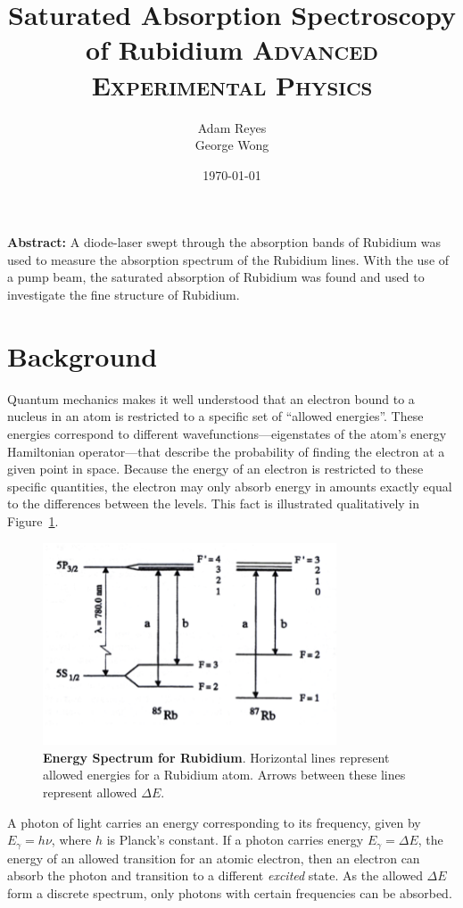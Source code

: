 \documentclass[paper=a4, fontsize=11pt]{scrartcl} %
\title{	
Saturated Absorption Spectroscopy of Rubidium
\horrule{0.5pt}
\normalfont \normalsize 
\textsc{Advanced Experimental Physics }
}
\author{Adam Reyes \\ George Wong} %
\date{\normalsize\today} %
\numberwithin{equation}{section}
\numberwithin{figure}{section}
\numberwithin{table}{section}
\begin{document}
\maketitle
\noindent\textbf{Abstract:}
A diode-laser swept through the absorption bands of Rubidium was used
to measure the absorption spectrum of the Rubidium lines. With the use
of a pump beam, the saturated absorption of Rubidium was found and
used to investigate the fine structure of Rubidium. 


\section{Background}


\indent Quantum mechanics makes it well understood that an electron bound to a nucleus in
an atom is restricted to a specific set of ``allowed energies''. These energies correspond to different wavefunctions---eigenstates of the atom's energy Hamiltonian operator---that
describe the probability of finding the electron at a given point in
space. Because the energy of an electron is restricted to these specific quantities, the electron
may only absorb energy in amounts exactly equal to the differences between 
the levels. This fact is illustrated qualitatively in Figure~\ref{fig:energies}. 

 \begin{figure}[h] \begin{center}
  \includegraphics[height=60mm]{energy.png}
  \caption{\textbf{Energy Spectrum for Rubidium}\cite{caltech}. Horizontal lines
    represent allowed energies for a Rubidium atom. Arrows between these lines represent allowed $\Delta E$. }
  \label{fig:energies}
\end{center} \end{figure}

A photon of light carries an energy corresponding to its
frequency, given by $E_\gamma = h\nu$, where $h$ is Planck's
constant. If a photon carries energy $E_\gamma = \Delta E$, the energy
of an allowed transition for an atomic electron, then an electron can
absorb the photon and transition to a different \emph{excited} state. As the allowed $\Delta E$ form a discrete spectrum, only photons with certain frequencies can be absorbed.
\end{document}
